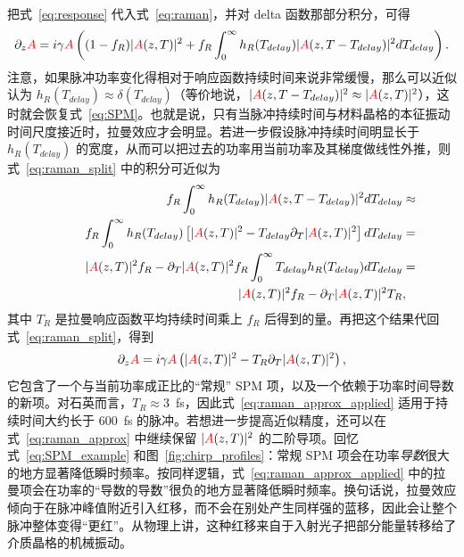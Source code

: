 把式~\ref{eq:response} 代入式~\ref{eq:raman}，并对 delta 函数那部分积分，可得
\begin{align}
    \label{eq:raman_split}
    \partial_z \textcolor{red}{A} = i\gamma\textcolor{red}{A}\left(
(1-f_R)|\textcolor{red}{A}(z,T)|^2+f_R \int_{0}^{\infty} h_R(T_{delay})|\textcolor{red}{A}(z,T-T_{delay})|^2 dT_{delay} \right).
\end{align}
注意，如果脉冲功率变化得相对于响应函数持续时间来说非常缓慢，那么可以近似认为 $h_R(T_{delay})\approx \delta(T_{delay})$（等价地说，$|\textcolor{red}{A}(z,T-T_{delay})|^2\approx|\textcolor{red}{A}(z,T)|^2$），这时就会恢复式~\ref{eq:SPM}。也就是说，只有当脉冲持续时间与材料晶格的本征振动时间尺度接近时，拉曼效应才会明显。若进一步假设脉冲持续时间明显长于 $h_R(T_{delay})$ 的宽度，从而可以把过去的功率用当前功率及其梯度做线性外推，则式~\ref{eq:raman_split} 中的积分可近似为
\begin{align}
\label{eq:raman_approx}
    f_R \int_{0}^{\infty} h_R(T_{delay})|\textcolor{red}{A}(z,T-T_{delay})|^2 dT_{delay} &\approx\\ \nonumber \quad\quad\quad f_R \int_{0}^{\infty} h_R(T_{delay})\left[
  |\textcolor{red}{A}(z,T)|^2-T_{delay}\partial_T|\textcolor{red}{A}(z,T)|^2 \right] dT_{delay} &=\\ \nonumber \quad\quad\quad  |\textcolor{red}{A}(z,T)|^2f_R- \partial_T|\textcolor{red}{A}(z,T)|^2 f_R\int_{0}^{\infty} T_{delay} h_R(T_{delay})
   dT_{delay}&=\\ \nonumber \quad\quad\quad  |\textcolor{red}{A}(z,T)|^2f_R- \partial_T|\textcolor{red}{A}(z,T)|^2 T_R &,
\end{align}
其中 $T_R$ 是拉曼响应函数平均持续时间乘上 $f_R$ 后得到的量。再把这个结果代回式~\ref{eq:raman_split}，得到
\begin{align}
    \label{eq:raman_approx_applied}
\partial_z \textcolor{red}{A} = i\gamma\textcolor{red}{A}\left(
|\textcolor{red}{A}(z,T)|^2-T_R \partial_T|\textcolor{red}{A}(z,T)|^2\right),
\end{align}
它包含了一个与当前功率成正比的“常规” SPM 项，以及一个依赖于功率时间导数的新项。对石英而言，$T_R\approx 3$~fs，因此式~\ref{eq:raman_approx_applied} 适用于持续时间大约长于 600~fs 的脉冲。若想进一步提高近似精度，还可以在式~\ref{eq:raman_approx} 中继续保留 $|\textcolor{red}{A}(z,T)|^2$ 的二阶导项。回忆式~\ref{eq:SPM_example} 和图~\ref{fig:chirp_profiles}：常规 SPM 项会在功率\emph{导数}很大的地方显著降低瞬时频率。按同样逻辑，式~\ref{eq:raman_approx_applied} 中的拉曼项会在功率的“导数的导数”很负的地方显著降低瞬时频率。换句话说，拉曼效应倾向于在脉冲峰值附近引入红移，而不会在别处产生同样强的蓝移，因此会让整个脉冲整体变得“更红”。从物理上讲，这种红移来自于入射光子把部分能量转移给了介质晶格的机械振动。

